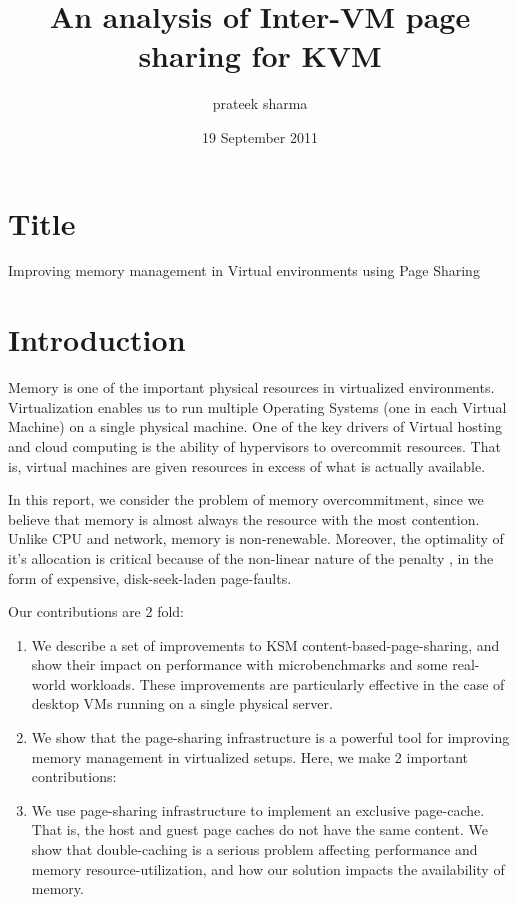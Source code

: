 \documentclass[11pt]{article}
\begin{document}
\title{An analysis of Inter-VM page sharing for KVM}
\author{prateek sharma}
\date{19 September 2011}
\maketitle

\setcounter{tocdepth}{3}
\tableofcontents
\vspace*{1cm}
\section{Title}
\label{sec-1}

Improving memory management in Virtual environments using Page Sharing
\section{Introduction}
\label{sec-2}

Memory is one of the important physical resources in virtualized environments. Virtualization enables us to run multiple Operating Systems (one in each Virtual Machine) on a single physical machine. One of the key drivers of Virtual hosting and cloud computing is the ability of hypervisors to overcommit resources. That is, virtual machines are given resources in excess of what is actually available.

In this report, we consider the problem of memory overcommitment, since we believe that memory is almost always the resource with the most contention. Unlike CPU and network, memory is non-renewable. Moreover, the optimality of it's allocation is critical because of the non-linear nature of the penalty , in the form of expensive, disk-seek-laden page-faults. 

Our contributions are 2 fold: 

\begin{enumerate}
\item We describe a set of improvements to KSM content-based-page-sharing, and show their impact on performance with microbenchmarks and some real-world workloads. These improvements are particularly effective in the case of desktop VMs running on a single physical server.
\item We show that the page-sharing infrastructure is a powerful tool for improving memory management in virtualized setups. Here, we make 2 important contributions:
\item We use page-sharing infrastructure to implement an exclusive page-cache. That is, the host and guest page caches do not have the same content. We show that double-caching is a serious problem affecting performance and memory resource-utilization, and how our solution impacts the availability of memory.
\end{enumerate}
\end{document}
